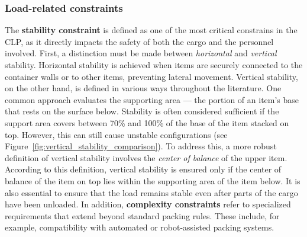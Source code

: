 \subsubsection{Load-related constraints}

The \textbf{stability constraint} is defined as one of the most critical constrains
in the \gls{CLP}, as it directly impacts
the safety of both the cargo and the personnel involved. First, a distinction
must be made between \textit{horizontal} and \textit{vertical} stability.
Horizontal stability is achieved when items are securely connected to the
container walls or to other items, preventing lateral movement. Vertical
stability, on the other hand, is defined in various ways throughout the
literature. One common approach evaluates the supporting area — the portion
of an item's base that rests on the surface below. Stability is often
considered sufficient if the support area covers between 70\% and 100\% of the base
of the item stacked on top. However, this can still cause unstable
configurations (see Figure~\ref{fig:vertical_stability_comparison}). To address this,
a more robust definition of vertical stability involves the
\textit{center of balance} of the upper item. According to this definition,
vertical stability is ensured only if the center of balance of the item on top
lies within the supporting area of the item below. It is also essential to
ensure that the load remains stable even after parts of the cargo have been
unloaded. In addition, \textbf{complexity constraints} refer to specialized
requirements that extend beyond standard packing rules. These include,
for example, compatibility with automated or robot-assisted packing systems.


